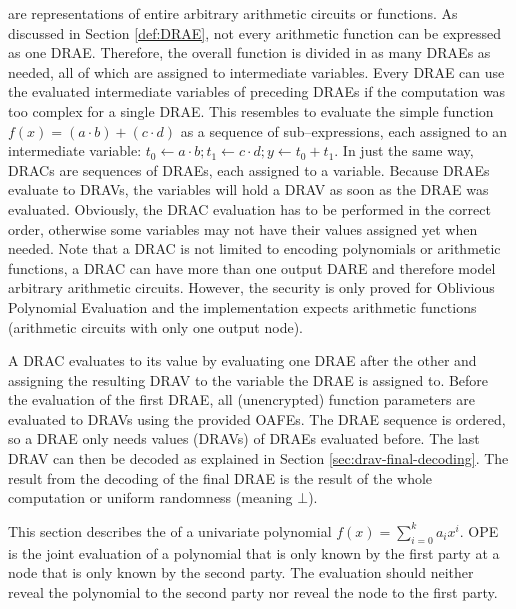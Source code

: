  are representations of entire
arbitrary arithmetic circuits or functions. As discussed in Section
\ref{def:DRAE}, not every arithmetic function can be expressed as one DRAE\@.
Therefore, the overall function is divided in as many DRAEs as needed, all of
which are assigned to intermediate variables. Every DRAE can use the evaluated
intermediate variables of preceding DRAEs if the computation was too complex
for a single DRAE\@.  This resembles to evaluate the simple function $f(x) = (a
\cdot b) + (c \cdot d)$ as a sequence of sub--expressions, each assigned to an
intermediate variable: $t_0 \leftarrow a \cdot b; t_1 \leftarrow c \cdot d; y
\leftarrow t_0 + t_1$.  In just the same way, DRACs are sequences of DRAEs, each
assigned to a variable.  Because DRAEs evaluate to DRAVs, the variables will
hold a DRAV as soon as the DRAE was evaluated. Obviously, the DRAC evaluation
has to be performed in the correct order, otherwise some variables may not have
their values assigned yet when needed.  Note that a DRAC is not limited to
encoding polynomials or arithmetic functions, a DRAC can have more than one
output DARE and therefore model arbitrary arithmetic circuits. However, the
security is only proved for Oblivious Polynomial Evaluation and the
implementation expects arithmetic functions (arithmetic circuits with only one
output node).


\label{sec:DRAC-eval}

A DRAC evaluates to its value by evaluating one DRAE after the other and
assigning the resulting DRAV to the variable the DRAE is assigned to. Before the
evaluation of the first DRAE, all (unencrypted) function parameters are
evaluated to DRAVs using the provided OAFEs. The DRAE sequence is ordered, so a
DRAE only needs values (DRAVs) of DRAEs evaluated before. The last DRAV can then
be decoded as explained in Section \ref{sec:drav-final-decoding}. The result
from the decoding of the final DRAE is the result of the whole computation or
uniform randomness (meaning $\bot$).


%
%
\label{sec:OPE}

This section describes the  of a
univariate polynomial $f(x) = \sum_{i=0}^k a_ix^i$. OPE is the joint evaluation
of a polynomial that is only known by the first party at a node that is only
known by the second party. The evaluation should neither reveal the polynomial
to the second party nor reveal the node to the first party.

